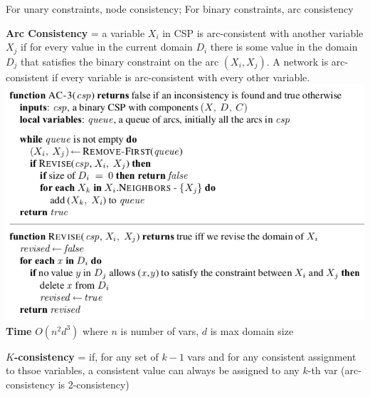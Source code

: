 \documentclass[10pt,landscape,a4paper]{article}
\begin{document}
\begin{multicols*}{4}
  For unary constraints, node consistency; For binary constraints, arc consistency

  \textbf{Arc Consistency} = a variable $X_i$ in CSP is arc-consistent with another variable $X_j$ if for every value in the current domain $D_i$ there is some value in the domain $D_j$ that satisfies the binary constraint on the arc $(X_i,X_j)$. A network is arc-consistent if every variable is arc-consistent with every other variable.
  \includegraphics[width=\columnwidth]{ac-3}
  \textbf{Time} $O(n^2d^3)$ where $n$ is number of vars, $d$ is max domain size

  \textbf{$K$-consistency} = if, for any set of $k-1$ vars and for any consistent assignment to thsoe variables, a consistent value can always be assigned to any $k$-th var (arc-consistency is 2-consistency)


\end{multicols*}
\end{document}
